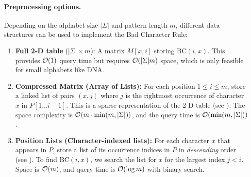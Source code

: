 \begin{example}
\begin{center}
\end{center}
\end{example}

\paragraph{Preprocessing options.}
Depending on the alphabet size $|\Sigma|$ and pattern length $m$, different data structures can be used to implement the Bad Character Rule:

\begin{enumerate}[label=\alph*)]
  \item \textbf{Full 2-D table} ($|\Sigma| \times m$):
        A matrix $M[x, i]$ storing $\mathrm{BC}(i, x)$.
        This provides $\mathcal{O}\!\left(1\right)$ query time but requires $\mathcal{O}\!\left(|\Sigma| m\right)$ space, which is only feasible for small alphabets like DNA.

  \item \textbf{Compressed Matrix (Array of Lists):}
        For each position $1 \le i \le m$, store a linked list of pairs $(x, j)$ where $j$ is the rightmost occurrence of character $x$ in $P[1 \ldots i-1]$. 
        This is a sparse representation of the 2-D table (see ).
        The space complexity is $\mathcal{O}\!\left(m \cdot \min(m, |\Sigma|)\right)$, and the query time is $\mathcal{O}\!\left(\min(m, |\Sigma|)\right)$.

  \item \textbf{Position Lists (Character-indexed lists):}
        For each character $x$ that appears in $P$, store a list of its occurrence indices in $P$ in \emph{descending} order (see ).
        To find $\mathrm{BC}(i, x)$, we search the list for $x$ for the largest index $j < i$.
        Space is $\mathcal{O}\!\left(m\right)$, and query time is $\mathcal{O}\!\left(\log m\right)$ with binary search.
\end{enumerate}

